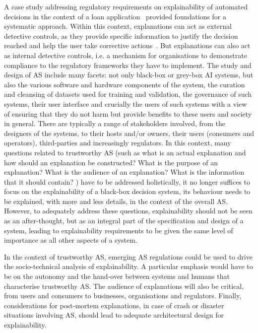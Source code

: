 \documentclass[sigconf,nonacm]{acmart}%
\begin{document}
	A case study addressing regulatory requirements on explainability of automated decisions in the context of a loan application~\cite{Huynh:DGOV21} provided foundations for a systematic approach. Within this context, explanations can act as external detective controls, as they provide specific information to justify the decision reached and help the user take corrective actions~\cite{Tsakalakis:CLSR21}. But explanations can also act as internal detective controls, i.e. a mechanism for organisations to demonstrate compliance to the regulatory frameworks they have to implement. 
	The study and design of AS include many facets: not only black-box or grey-box AI systems, but also the various software and hardware components of the system, the curation and cleansing of datasets used for training and validation, the governance of such systems, their user interface and crucially the users of such systems with a view of ensuring that they do not harm but provide benefits to these users and society in general. There are typically a range of stakeholders involved, from the designers of the systems, to their hosts and/or owners, their users (consumers and operators), third-parties and increasingly regulators. In this context, many questions related to trustworthy AS (such as what is an actual explanation and how should an explanation be constructed? What is the purpose of an explanation? What is the audience of an explanation? What is the information that it should contain? \cite{Huynh:DGOV21,Tsakalakis:CLSR21}) have to be addressed holistically, it no longer suffices to focus on the explainability of a black-box decision system, its behaviour needs to be explained, with more and less details, in the context of the overall AS. However, to adequately address these questions, explainability should not be seen as an after-thought, but as an integral part of the specification and design of a system, leading to explainability requirements to be given the same level of importance as all other aspects of a system. 
	
	In the context of trustworthy AS, emerging AS regulations could be used to drive the socio-technical analysis of explainability. A particular emphasis would have to be on the autonomy and the hand-over between systems and humans that characterise trustworthy AS. The audience of explanations will also be critical, from users and consumers to businesses, organisations and regulators. Finally, considerations for post-mortem explanations, in case of crash or disaster situations involving AS, should lead to adequate architectural design for explainability.
	
\end{document}
